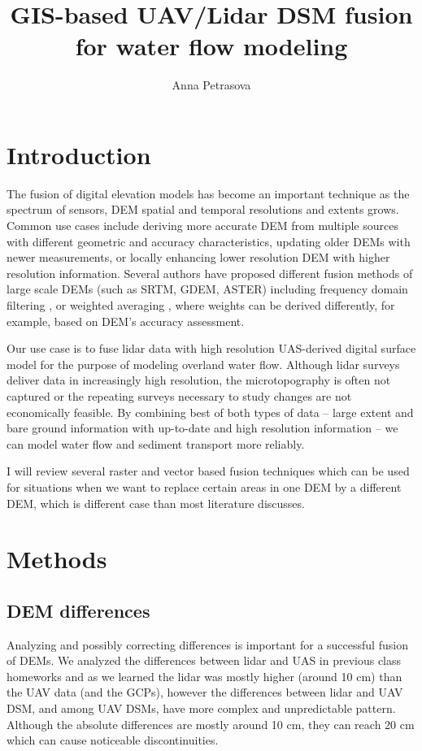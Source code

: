 \documentclass[a4paper,10pt]{article}
\title{GIS-based UAV/Lidar DSM fusion for water flow modeling}
\author{Anna Petrasova}
\begin{document}
\maketitle
\section*{Introduction}
The fusion of digital elevation models has become an important technique
as the spectrum of sensors, DEM spatial and temporal resolutions and extents grows.
Common use cases include deriving more accurate DEM from multiple sources with different geometric
and accuracy characteristics, updating older DEMs with newer measurements, or locally enhancing
lower resolution DEM with higher resolution information.
Several authors have proposed different fusion methods of large scale DEMs 
(such as SRTM, GDEM, ASTER)
including frequency domain filtering \citep{Karkee2008}, or weighted averaging \citep{Tran2014, Papasaika2011},
where weights can be derived differently, for example, based on DEM's accuracy assessment.

Our use case is to fuse lidar data with high resolution UAS-derived digital surface model
for the purpose of modeling overland water flow. Although lidar surveys deliver data
in increasingly high resolution, the microtopography is often not captured
or the repeating surveys necessary to study changes are not economically feasible.
By combining best of both types of data -- large extent and bare ground information with
up-to-date and high resolution information -- we can model water flow and sediment transport more reliably.

I will review several raster and vector based fusion techniques which can be used for situations when
we want to replace certain areas in one DEM by a different DEM, which is different case than
most literature discusses.


\section*{Methods}

\subsection*{DEM differences}
Analyzing and possibly correcting differences is important for a successful fusion of DEMs.
We analyzed the differences between lidar and UAS in previous class homeworks
and as we learned the lidar was mostly higher (around 10 cm) than the UAV data (and the GCPs),
however the differences between lidar and UAV DSM, and among UAV DSMs, have more complex and unpredictable 
pattern. Although the absolute differences are mostly around 10 cm, they can reach 20 cm which 
can cause noticeable discontinuities.
\end{document}
